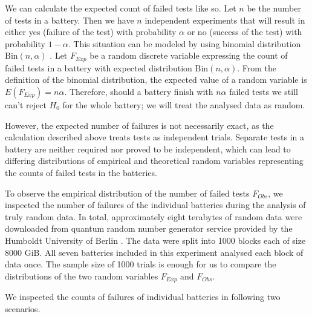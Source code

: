 \documentclass[
	digital,    %
	oneside,    %
	color,
	11pt,
	nocover,
	notable,
	nolof,
	nolot,
]{fithesis3}
\theoremstyle{definition}
\theoremstyle{remark}
\begin{document}
We can calculate the expected count of failed tests like so. Let $n$ be the number of tests in a battery. Then we have $n$ independent experiments that will result in either yes (failure of the test) with probability $\alpha$ or no (success of the test) with probability $1-\alpha$. This situation can be modeled by using binomial distribution $\text{Bin}(n, \alpha)$ \cite[p.~245]{stat-handbook}. Let $F_{Exp}$ be a random discrete variable expressing the count of failed tests in a battery with expected distribution $\text{Bin}(n, \alpha)$. From the definition of the binomial distribution, the expected value of a random variable is $E(F_{Exp}) = n\alpha$. Therefore, should a battery finish with $n\alpha$ failed tests we still can't reject $H_0$ for the whole battery; we will treat the analysed data as random.

However, the expected number of failures is not necessarily exact, as the calculation described above treats tests as independent trials. Separate tests in a battery are neither required nor proved to be independent, which can lead to differing distributions of empirical and theoretical random variables representing the counts of failed tests in the batteries.

To observe the empirical distribution of the number of failed tests $F_{Obs}$, we inspected the number of failures of the individual batteries during the analysis of truly random data. In total, approximately eight terabytes of random data were downloaded from quantum random number generator service provided by the Humboldt University of Berlin \cite{qrng-service-germany}. The data were split into 1000 blocks each of size 8000 GiB. All seven batteries included in this experiment analysed each block of data once. The sample size of 1000 trials is enough for us to compare the distributions of the two random variables $F_{Exp}$ and $F_{Obs}$.

We inspected the counts of failures of individual batteries in following two scenarios.
\end{document}
